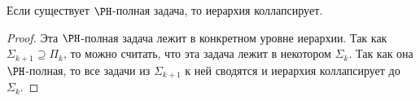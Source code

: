 	\begin{conseq}
		Если существует $\PH$-полная задача, то иерархия коллапсирует.
	\end{conseq}
	\begin{proof}
		Эта $\PH$-полная задача лежит в конкретном уровне иерархии.
		Так как $\Sigma_{k+1}\supseteq \Pi_k$, то можно считать, что эта задача лежит в некотором $\Sigma_k$.
		Так как она $\PH$-полная, то все задачи из $\Sigma_{k+1}$ к ней сводятся и иерархия коллапсирует до $\Sigma_k$.
	\end{proof}
